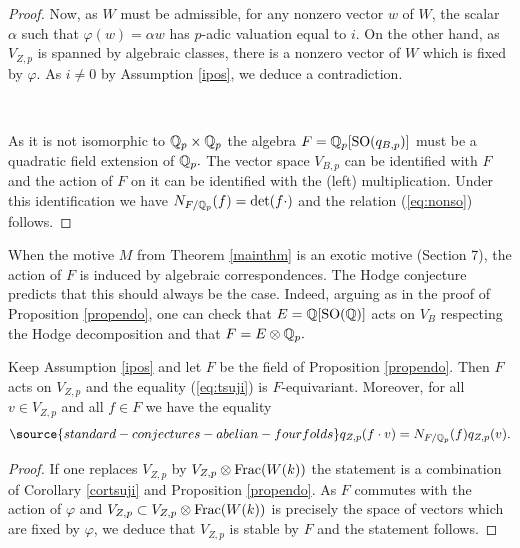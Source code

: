 \begin{proof}
Now, as $W$ must be admissible, for any nonzero vector $w$ of $W$, the scalar $\alpha$ such that $\varphi(w)=\alpha w$ has $p$-adic valuation equal to $i$.
On the other hand, as  $V_{Z,p}$ is spanned by algebraic classes,  there is a nonzero vector of $W$ which is fixed by $\varphi$. As $i\neq 0$ by Assumption  \ref{ipos}, we deduce a contradiction.

\

As it is not isomorphic to $\mathbb{Q}_p \times \mathbb{Q}_p$ the algebra $F=\mathbb{Q}_p[\textnormal{SO}(q_{B,p})]$ must be a quadratic field extension of $\mathbb{Q}_p.$ The vector space $V_{B,p}$ can be identified with $F$ and the action of $F$ on it can be identified with the (left) multiplication. Under this identification we have $N_{F/\mathbb{Q}_p}(f)= \det(f \cdot)$ and the relation  (\ref{eq:nonso})   follows.
\end{proof}
\begin{remark}
\notready
When the motive $M$ from Theorem \ref{mainthm} is  an exotic motive (Section 7), the action of $F$ is induced by algebraic correspondences. The Hodge conjecture predicts that this should always be the case. Indeed, arguing as in the proof of Proposition \ref{propendo}, one can check that $E=\mathbb{Q}[\textnormal{SO}(\mathbb{Q})]$ acts on $V_B$ respecting the Hodge decomposition and that $F=E \otimes \mathbb{Q}_p.$
\end{remark}
\begin{corollary}
\notready\label{nonso}
Keep Assumption  \ref{ipos} and let $F$ be the field of  Proposition \ref{propendo}. Then $F$ acts on $V_{Z,p}$ and the equality  (\ref{eq:tsuji}) is $F$-equivariant. Moreover,  for all $v\in V_{Z,p} $ and all $f\in F$  we have the equality
\begin{equation} \label{eq:nonso2}
\source{standard-conjectures-abelian-fourfolds}
q_{Z,p}(f \cdot v)=N_{F/\Q_p}(f) q_{Z,p}(v).
\end{equation}
\end{corollary}
\begin{proof}
If one replaces $V_{Z,p}$ by $V_{Z,p}\otimes \mathrm{Frac}(W(k))$ the statement is a combination of  Corollary \ref{cortsuji}   and Proposition \ref{propendo}. As $F$ commutes with the action of $\varphi$ and $V_{Z,p} \subset V_{Z,p}\otimes \mathrm{Frac}(W(k))$ is precisely the space of vectors which are fixed by $\varphi$, we deduce that $V_{Z,p}$ is stable by $F$ and the statement follows.
\end{proof}
